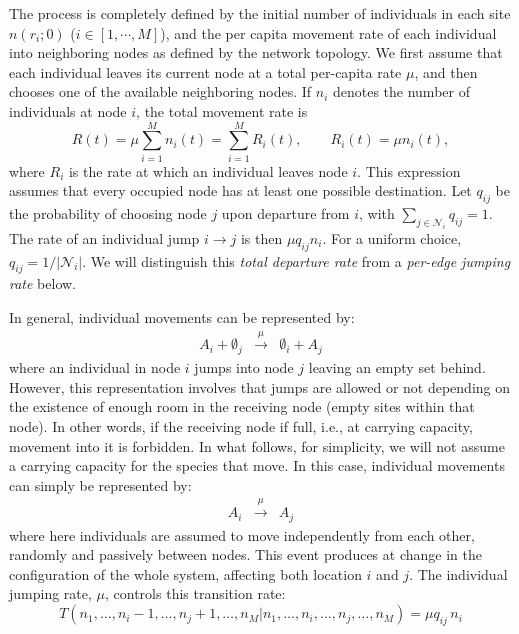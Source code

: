 The process is completely defined by the initial number of individuals in each site $n(r_i;0)$ ($i \in [1,\cdots,M]$), and the per capita movement rate of each individual into neighboring nodes as defined by the network topology. We first assume that each individual leaves its current node at a total per-capita rate $\mu$, and then chooses one of the available neighboring nodes. If $n_i$ denotes the number of individuals at node $i$, the total movement rate is
\begin{equation}
R(t) =  \mu \sum_{i=1}^{M} n_i(t)
     = \sum_{i=1}^{M} R_i(t), \qquad R_i(t)=\mu n_i(t),
\label{eq:R_M}
\end{equation}
where $R_i$ is the rate at which an individual leaves node $i$. This expression assumes that every occupied node has at least one possible destination. Let $q_{ij}$ be the probability of choosing node $j$ upon departure from $i$, with $\sum_{j\in\mathcal N_i}q_{ij}=1$. The rate of an individual jump $i\to j$ is then $\mu q_{ij}n_i$. For a uniform choice, $q_{ij}=1/|\mathcal N_i|$. We will distinguish this \emph{total departure rate} from a \emph{per-edge jumping rate} below.  
\smallskip

In general, individual movements can be represented by: 
\begin{eqnarray}
A_i + \emptyset_j & \xrightarrow{\mu} &  \emptyset_i + A_j \label{MovementCapacity}
\end{eqnarray}
where an individual in node $i$ jumps into node $j$ leaving an empty set behind. However, this representation involves that jumps are allowed or not depending on the existence of enough room in the receiving node (empty sites within that node). In other words, if the receiving node if full, i.e., at carrying capacity, movement into it is forbidden. In what follows, for simplicity, we will not assume a carrying capacity for the species that move. In this case, individual movements can simply be represented by: 
\begin{eqnarray}
A_i  & \xrightarrow{\mu} &   A_j \label{Movement}
\end{eqnarray}
where here individuals are assumed to move independently from each other, randomly and passively between nodes. This event produces at change in the configuration of the whole system, affecting both location $i$ and $j$. The individual jumping rate, $\mu$, controls this transition rate:
\begin{equation} 
\label{Tu}
T(n_1, \dots, n_i-1, \dots, n_j+1, \dots, n_M|n_1, \dots, n_i, \dots, n_j, \dots, n_M )  = \mu q_{ij}\,n_i
\end{equation} 

